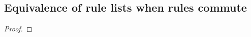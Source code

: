 \begin{arxiv}
\begin{comment}
Suppose prefixes~$\cal P$ and~$\cal Q$ capture the same data,
and now derive~$\cal P'$ from~$\cal P$ by appending antecedent~$p$
and derive~$\cal Q'$ from~$\cal Q$ by appending antecedent~$q$.
%
Suppose further that~$p$ and~$q$ capture nearly the same data, except that
they exclusively capture data~$x_p$ and~$x_q$ in their respective contexts,
such that the normalized support of~$x_p$ and of~$x_q$ are each bounded by
the regularization parameter: ${s(x_p), s(x_q) < c}$.
%
Our minimum support bound~\eqref{eq:min-capture} implies
that~$p$ would never be placed below~$\cal Q'$ nor~$q$ below~$\cal P'$.

Extensions of~$\cal P'$ and~$\cal Q'$ will behave similarly.
%
The largest difference would occur if a rule list starting with~$\cal P'$
misclassified all of~$x_p$ and~$x_q$, while the analogous rule list starting
with~$\cal Q'$ correctly classified all these data, or vice versa,
yielding a difference between objectives bounded by~$2c$.
%
Let~$\cal P^*$ and~$\cal Q^*$ be the optimal prefixes
starting with~$\cal P'$ and~$\cal Q'$, respectively.
%
Note that~$\cal P^*$ and~$\cal Q^*$ need not be derived from~$\cal P'$ and~$\cal Q'$
via analogous extensions.
%
If we know~$\cal P^*$, then we can avoid evaluating \emph{any} extensions of~$\cal Q'$ if
\begin{align}
\Obj(\Prefix^*) - 2 c \ge \Obj^*,
\end{align}
where~$\Obj^*$ is the best known objective, since the left had expression
provides a lower bound on~$\Obj(\cal{Q}^*)$.
\end{comment}


\subsection{Equivalence of rule lists when rules commute}

\begin{theorem}
\end{theorem}

\begin{proof}
\end{proof}

\end{arxiv}

